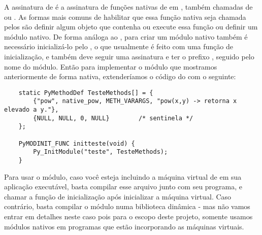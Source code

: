     A assinatura de  é a assinatura de funções nativas de  em \C{},
    também chamadas de  ou . As formas mais comuns
    de habilitar que essa função nativa seja chamada pelos  são definir algum 
    objeto que contenha ou execute essa função ou definir um módulo nativo. De forma análoga 
    ao , para criar um módulo nativo também é necessário inicializá-lo pelo \C{},
    o que usualmente é feito com uma função de inicialização, e também deve seguir uma assinatura
    e ter o prefixo , seguido pelo nome do módulo. Então para implementar o módulo
     que mostramos anteriormente de forma nativa, extenderíamos o código do
     com o seguinte:
    
    \begin{lstlisting}
    static PyMethodDef TesteMethods[] = {
        {"pow", native_pow, METH_VARARGS, "pow(x,y) -> retorna x elevado a y."},
        {NULL, NULL, 0, NULL}        /* sentinela */
    };

    PyMODINIT_FUNC initteste(void) {
        Py_InitModule("teste", TesteMethods);
    }  
    \end{lstlisting}
    
    Para usar o módulo, caso você esteja incluindo a máquina virtual de 
    em sua aplicação executável, basta compilar esse arquivo junto com seu programa, 
    e chamar a função de inicialização  após inicializar a máquina 
    virtual. Caso contrário, basta compilar o módulo numa biblioteca 
    dinâmica - mas não vamos entrar em detalhes neste caso pois para o escopo deste 
    projeto, somente usamos módulos nativos em programas que estão incorporando as 
    máquinas virtuais.
